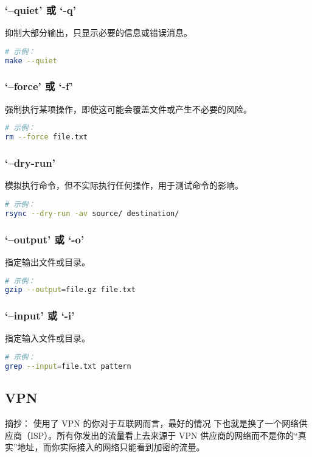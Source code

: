\documentclass[a4paper, 12pt]{article}
\begin{document}
\subsubsection{‘--quiet’ 或 ‘-q’}
抑制大部分输出，只显示必要的信息或错误消息。
\begin{lstlisting}[language=bash]
# 示例：
make --quiet
\end{lstlisting}

\subsubsection{‘--force’ 或 ‘-f’}
强制执行某项操作，即使这可能会覆盖文件或产生不必要的风险。
\begin{lstlisting}[language=bash]
# 示例：
rm --force file.txt
\end{lstlisting}

\subsubsection{‘--dry-run’}
模拟执行命令，但不实际执行任何操作，用于测试命令的影响。
\begin{lstlisting}[language=bash]
# 示例：
rsync --dry-run -av source/ destination/
\end{lstlisting}

\subsubsection{‘--output’ 或 ‘-o’}
指定输出文件或目录。
\begin{lstlisting}[language=bash]
# 示例：
gzip --output=file.gz file.txt
\end{lstlisting}

\subsubsection{‘--input’ 或 ‘-i’}
指定输入文件或目录。
\begin{lstlisting}[language=bash]
# 示例：
grep --input=file.txt pattern
\end{lstlisting}

\subsection{VPN}
摘抄：
使用了 VPN 的你对于互联网而言，最好的情况 下也就是换了一个网络供应商（ISP）。所有你发出的流量看上去来源于 VPN 供应商的网络而不是你的“真实”地址，而你实际接入的网络只能看到加密的流量。
\end{document}
